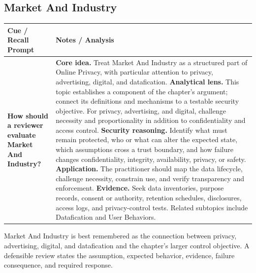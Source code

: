\documentclass[11pt]{article}
\newcommand{\CornellHeader}{%
\rowcolor{Navy}\color{white}\bfseries Cue / Recall Prompt & \color{white}\bfseries Notes / Analysis\\\hline}
\newcommand{\CornellRow}[2]{%
\cellcolor{CueGray}\RaggedRight\textbf{#1} & \RaggedRight #2\\\hline}
\begin{document}
\subsection*{Market And Industry}
\begin{longtable}{>{\RaggedRight\arraybackslash}p{}|>{\RaggedRight\arraybackslash}p{}}
\CornellHeader
\CornellRow{How should a reviewer evaluate Market And Industry?}{\textbf{Core idea.} Treat Market And Industry as a structured part of Online Privacy, with particular attention to privacy, advertising, digital, and datafication. \textbf{Analytical lens.} This topic establishes a component of the chapter's argument; connect its definitions and mechanisms to a testable security objective. For privacy, advertising, and digital, challenge necessity and proportionality in addition to confidentiality and access control. \textbf{Security reasoning.} Identify what must remain protected, who or what can alter the expected state, which assumptions cross a trust boundary, and how failure changes confidentiality, integrity, availability, privacy, or safety. \textbf{Application.} The practitioner should map the data lifecycle, challenge necessity, constrain use, and verify transparency and enforcement. \textbf{Evidence.} Seek data inventories, purpose records, consent or authority, retention schedules, disclosures, access logs, and privacy-control tests. Related subtopics include Datafication and User Behaviors.}
\end{longtable}
\begin{topicsummary}
Market And Industry is best remembered as the connection between privacy, advertising, digital, and datafication and the chapter's larger control objective. A defensible review states the assumption, expected behavior, evidence, failure consequence, and required response.
\end{topicsummary}
\end{document}
